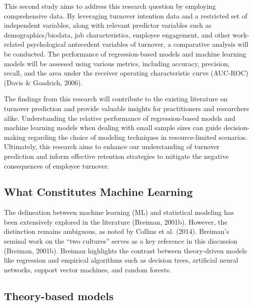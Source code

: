 \documentclass[
  jou]{apa6}
\begin{document}
This second study aims to address this research question by employing comprehensive data.
By leveraging turnover intention data and a restricted set of independent variables, along with relevant predictor variables such as demographics/biodata, job characteristics, employee engagement, and other work-related psychological antecedent variables of turnover, a comparative analysis will be conducted.
The performance of regression-based models and machine learning models will be assessed using various metrics, including accuracy, precision, recall, and the area under the receiver operating characteristic curve (AUC-ROC) (Davis \& Goadrich, 2006).

The findings from this research will contribute to the existing literature on turnover prediction and provide valuable insights for practitioners and researchers alike.
Understanding the relative performance of regression-based models and machine learning models when dealing with small sample sizes can guide decision-making regarding the choice of modeling techniques in resource-limited scenarios.
Ultimately, this research aims to enhance our understanding of turnover prediction and inform effective retention strategies to mitigate the negative consequences of employee turnover.

\hypertarget{what-constitutes-machine-learning}{%
\subsection{What Constitutes Machine Learning}\label{what-constitutes-machine-learning}}

The delineation between machine learning (ML) and statistical modeling has been extensively explored in the literature (Breiman, 2001b).
However, the distinction remains ambiguous, as noted by Collins et al. (2014).
Breiman's seminal work on the ``two cultures'' serves as a key reference in this discussion (Breiman, 2001b).
Breiman highlights the contrast between theory-driven models like regression and empirical algorithms such as decision trees, artificial neural networks, support vector machines, and random forests.

\hypertarget{theory-based-models}{%
\subsection{Theory-based models}\label{theory-based-models}}
\end{document}
